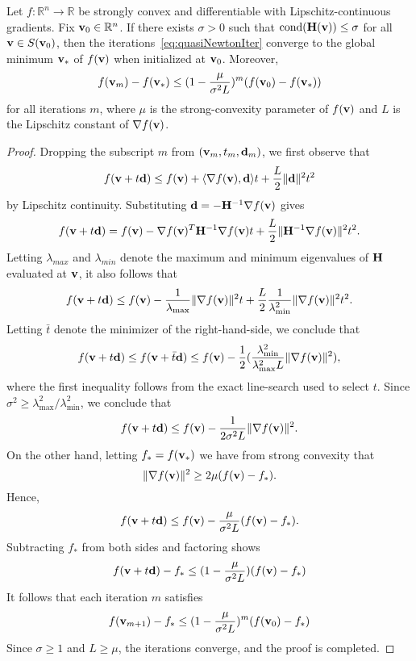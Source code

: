 \begin{lemma}\label{lem:GlobalConv}
  Let $f : \mathbb{R}^n \rightarrow \mathbb{R}$ be strongly convex and differentiable
  with Lipschitz-continuous gradients.
  Fix ${\mathbf{v}}_0 \in\mathbb{R}^n$. If there exists $\sigma > 0$
  such that $\text{cond}({\mathbf{H}}({\mathbf{v}})) \le \sigma$ for all  ${\mathbf{v}} \in S({\mathbf{v}}_0)$, then
  the iterations~\eqref{eq:quasiNewtonIter}
  converge to the global minimum ${\mathbf{v}}_*$ of $f({\mathbf{v}})$ when initialized at ${\mathbf{v}}_0$.
  Moreover,
  \[
    f({\mathbf{v}}_m)  - f({\mathbf{v}}_*)  \le (1-\frac{\mu}{\sigma^2 L})^m (f({\mathbf{v}}_0) - f({\mathbf{v}}_*))
  \]
  for all iterations $m$, where $\mu$ is the strong-convexity parameter of $f({\mathbf{v}})$ and $L$ is
  the Lipschitz constant of $\nabla f({\mathbf{v}})$.
  \begin{proof}
    Dropping the subscript $m$ from $({\mathbf{v}}_m, t_m, {\mathbf{d}}_m)$, we first observe that
\[
f({\mathbf{v}}+t{\mathbf{d}}) \le f({\mathbf{v}}) + \langle \nabla f({\mathbf{v}}), {\mathbf{d}} \rangle t + \frac{L}{2}\|{\mathbf{d}}\|^2 t^2
\]
by Lipschitz continuity.  Substituting ${\mathbf{d}} =- {\mathbf{H}}^{-1}  \nabla  f({\mathbf{v}})$ gives
\[
f({\mathbf{v}}+t{\mathbf{d}}) = f({\mathbf{v}}) - \nabla f({\mathbf{v}})^T  {\mathbf{H}}^{-1}  \nabla  f({\mathbf{v}}) t + \frac{L }{2}\|{\mathbf{H}}^{-1}\nabla f({\mathbf{v}}) \|^2 t^2.
\]
Letting $\lambda_{max}$ and $\lambda_{min}$ denote the
maximum and minimum eigenvalues of ${\mathbf{H}}$ evaluated at ${\mathbf{v}}$, it also follows that
\[
  f({\mathbf{v}}+t{\mathbf{d}}) \le f({\mathbf{v}}) - \frac{1}{\lambda_{\max}} \|\nabla f({\mathbf{v}})\|^2 t  + 
    \frac{L }{2}  \frac{1}{\lambda^{2}_{\min}} \|\nabla f({\mathbf{v}})\|^2 t^2.
\]
Letting $\bar t$ denote the  minimizer of the right-hand-side, we
conclude that
    \[
      f({\mathbf{v}}+t{\mathbf{d}}) \le  f({\mathbf{v}} + \bar t{\mathbf{d}} ) \le f({\mathbf{v}}) - \frac{1}{2}(\frac{\lambda^{2}_{\min}}{\lambda^2_{\max} L} 
      \|\nabla f({\mathbf{v}})\|^2),
    \]
where the first inequality follows from the exact line-search
used to select $t$.
Since  $\sigma^2 \ge \lambda^{2}_{\max}/\lambda^2_{\min}$,
we conclude that
\[
   f({\mathbf{v}} + t {\mathbf{d}}) \le f({\mathbf{v}}) - \frac{1}{2\sigma^2 L}\| \nabla f({\mathbf{v}}) \|^2.
\]
    On the other hand, letting $f_* = f({\mathbf{v}}_*)$ 
    we have from strong convexity that
    \[
  \|\nabla f({\mathbf{v}})\|^2 \ge 2\mu (f({\mathbf{v}})-f_* ).
    \]
Hence,
\[
  f({\mathbf{v}} + t {\mathbf{d}})   \le f({\mathbf{v}}) - \frac{\mu}{\sigma^2 L} (f({\mathbf{v}})-f_* ).
\]
Subtracting $f_*$ from both sides and factoring shows
\[
  f({\mathbf{v}} + t {\mathbf{d}})  - f_* \le  (1-\frac{\mu}{\sigma^2 L})(f({\mathbf{v}}) - f_*)
\]
It follows that each iteration $m$ satisfies
\[
  f({\mathbf{v}}_{m+1}) - f_* \le  (1-\frac{\mu}{\sigma^2 L})^{m}(f({\mathbf{v}}_{0}) - f_*)
\]
Since $\sigma \ge 1$ and $L \ge \mu$, the iterations converge, and the proof is completed.
  \end{proof}
\end{lemma}

